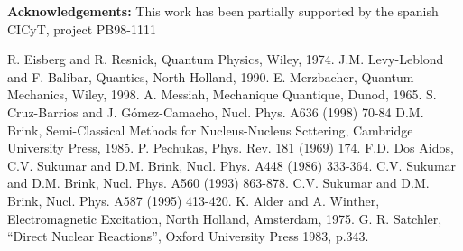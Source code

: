 \documentclass[aps,preprint,prl]{revtex4-2}
\begin{document}
\bigskip

{\bf Acknowledgements:} This work has been partially supported by the
spanish CICyT, project PB98-1111 

\begin{references}
 R. Eisberg and R. Resnick, Quantum Physics,  Wiley, 1974.
 J.M. Levy-Leblond and F. Balibar, Quantics, North Holland, 1990.
 E. Merzbacher, Quantum Mechanics, Wiley, 1998.
 A. Messiah, Mechanique Quantique, Dunod, 1965.
 S. Cruz-Barrios and J. G\'omez-Camacho, Nucl. Phys. A636 (1998)
70-84
 D.M. Brink, Semi-Classical Methods for Nucleus-Nucleus 
Scttering, Cambridge University Press, 1985.                              
 P. Pechukas, Phys. Rev. 181 (1969) 174.
 F.D. Dos Aidos, C.V. Sukumar and D.M. Brink, Nucl. Phys. A448 
(1986) 333-364.
 C.V. Sukumar and D.M. Brink, Nucl. Phys. A560 (1993) 863-878.
 C.V. Sukumar and D.M. Brink, Nucl. Phys. A587 (1995) 413-420. 
 K. Alder and A. Winther, Electromagnetic Excitation, 
North Holland,  Amsterdam, 1975.
 G. R. Satchler, ``Direct Nuclear Reactions'', Oxford University
Press 1983, p.343.
\end{references} 
\end{document}
